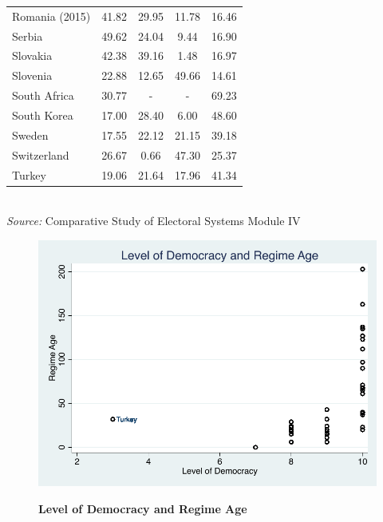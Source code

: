 \documentclass[12pt, titlepage]{article}
\newcommand\e{\emph}
\newcommand\tb{\textbf}
\begin{document}
\begin{table}
\begin{tabulary}{\linewidth}{l c c c c}
		Romania (2015)&41.82&29.95&11.78&16.46 \\
		Serbia&49.62&24.04&9.44&16.90 \\
		Slovakia&42.38&39.16&1.48&16.97 \\
		Slovenia&22.88&12.65&49.66&14.61 \\
		South Africa&30.77&-&-&69.23 \\
		South Korea&17.00&28.40&6.00&48.60 \\
		Sweden&17.55&22.12&21.15&39.18 \\
		Switzerland&26.67&0.66&47.30&25.37 \\
		Turkey&19.06&21.64&17.96&41.34 \\
		\hline
	\end{tabulary} \\
\e{Source:} Comparative Study of Electoral Systems Module IV 
\label{table2}
\end{table}




\begin{figure}[ht!]    \centering
	{	 \includegraphics[width=\textwidth]{RegimeDemocracy}}
	\caption{\tb{Level of Democracy and Regime Age}}\label{figure2}
\end{figure}
\end{document}
